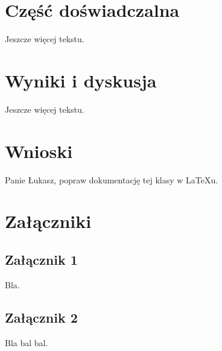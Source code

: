 \documentclass{SGGW-thesis}
\begin{document}
\chapter{Część doświadczalna}
Jeszcze więcej tekstu.

\chapter{Wyniki i dyskusja}
Jeszcze więcej tekstu.

\chapter{Wnioski}
Panie Łukasz, popraw dokumentację tej klasy w LaTeXu.

\chapter{Załączniki}
\section{Załącznik 1}
Bla.

\section{Załącznik 2}
Bla bal bal.



\beforelastpage[2023]
\end{document}
